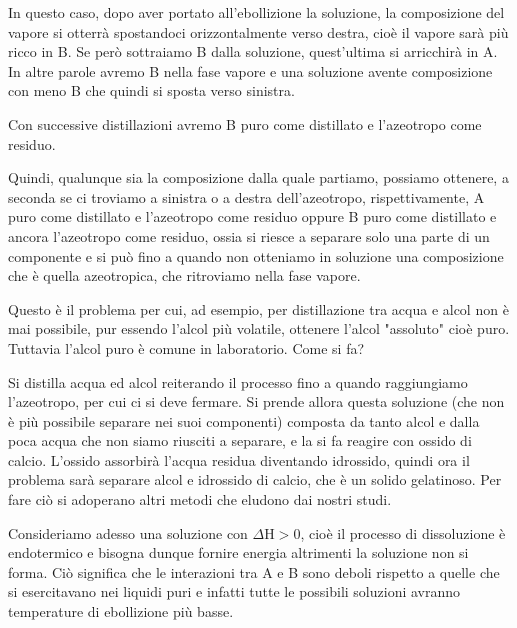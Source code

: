 In questo caso, dopo aver portato all'ebollizione la soluzione, la composizione del vapore si otterrà spostandoci orizzontalmente verso destra, cioè il vapore sarà più ricco in B. Se però sottraiamo B dalla soluzione, quest'ultima si arricchirà in A. In altre parole avremo B nella fase vapore e una soluzione avente composizione con meno B che quindi si sposta verso sinistra.

Con successive distillazioni avremo B puro come distillato e l'azeotropo come residuo.

Quindi, qualunque sia la composizione dalla quale partiamo, possiamo ottenere, a seconda se ci troviamo a sinistra o a destra dell'azeotropo, rispettivamente, A puro come distillato e l'azeotropo come residuo oppure B puro come distillato e ancora l'azeotropo come residuo, ossia si riesce a separare solo una parte di un componente e si può fino a quando non otteniamo in soluzione una composizione che è quella azeotropica, che ritroviamo nella fase vapore.

Questo è il problema per cui, ad esempio, per distillazione tra acqua e alcol non è mai possibile, pur essendo l'alcol più volatile, ottenere l'alcol "assoluto" cioè puro. Tuttavia l'alcol puro è comune in laboratorio. Come si fa?

Si distilla acqua ed alcol reiterando il processo fino a quando raggiungiamo l'azeotropo, per cui ci si deve fermare. Si prende allora questa soluzione (che non è più possibile separare nei suoi componenti) composta da tanto alcol e dalla poca acqua che non siamo riusciti a separare, e la si fa reagire con ossido di calcio. L'ossido assorbirà l'acqua residua diventando idrossido, quindi ora il problema sarà separare alcol e idrossido di calcio, che è un solido gelatinoso. Per fare ciò si adoperano altri metodi che eludono dai nostri studi.

\vspace{0.2cm}Consideriamo adesso una soluzione con $\Delta$H$>$0, cioè il processo di dissoluzione è endotermico e bisogna dunque fornire energia altrimenti la soluzione non si forma. Ciò significa che le interazioni tra A e B sono deboli rispetto a quelle che si esercitavano nei liquidi puri e infatti tutte le possibili soluzioni avranno temperature di ebollizione più basse.


